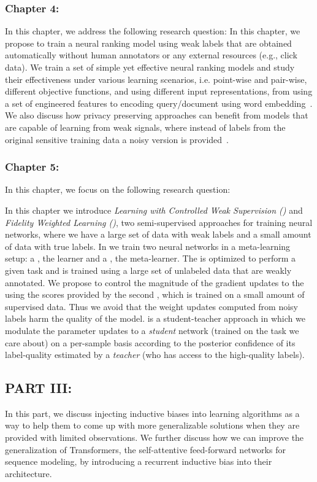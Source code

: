 \subsubsection*{Chapter 4: }
In this chapter, we address the following research question:
In this chapter, we propose to train a neural ranking model using weak labels that are obtained automatically without human annotators or any external resources (e.g., click data). We train a set of simple yet effective neural ranking models and study their effectiveness under various learning scenarios, i.e. point-wise and pair-wise, different objective functions, and using different input representations, from using a set of engineered features to encoding query/document using word embedding~\citep{Dehghani:2017:SIGIR}. We also discuss how privacy preserving approaches can benefit from models that are capable of learning from weak signals, where instead of labels from the original sensitive training data a noisy version is provided~\citep{dehghani:2017:neuir}.

\subsubsection*{Chapter 5: }
In this chapter, we focus on the following research question:

In this chapter we introduce \emph{Learning with Controlled Weak Supervision (\cws)} and \emph{Fidelity Weighted Learning (\fwl)}, two semi-supervised approaches for training neural networks, where we have a large set of data with weak labels and a small amount of data with true labels. 
%
In \cws we train two neural networks in a meta-learning setup: a \tnet, the learner and a \cnet, the meta-learner.  The \tnet is optimized to perform a given task and is trained using a large set of unlabeled data that are weakly annotated. We propose to control the magnitude of the gradient updates to the \tnet using the scores provided by the second \cnet, which is trained on a small amount of supervised data. Thus we avoid that the weight updates computed from noisy labels harm the quality of the \tnet model.
%
\fwl is a student-teacher approach in which we modulate the parameter updates to a \emph{student} network (trained on the task we care about) on a per-sample basis according to the posterior confidence of its label-quality estimated by a \emph{teacher} (who has access to the high-quality labels).  

\subsection*{PART III: }
In this part, we discuss injecting inductive biases into learning algorithms as a way to help them to come up with more generalizable solutions when they are provided with limited observations. We further discuss how we can improve the generalization of Transformers, the self-attentive feed-forward networks for sequence modeling, by introducing a recurrent inductive bias into their architecture.

